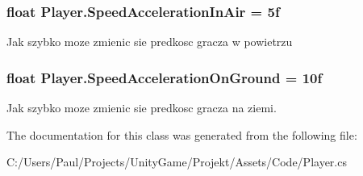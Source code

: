 \subsubsection[{Speed\+Acceleration\+In\+Air}]{\setlength{\rightskip}{0pt plus 5cm}float Player.\+Speed\+Acceleration\+In\+Air = 5f}\label{class_player_a6a71edc877a84d4f038fcc2b8e4f2843}


Jak szybko moze zmienic sie predkosc gracza w powietrzu 

\hypertarget{class_player_ae1d47d3f4f67909f7498d900c1feedfa}{}
\subsubsection[{Speed\+Acceleration\+On\+Ground}]{\setlength{\rightskip}{0pt plus 5cm}float Player.\+Speed\+Acceleration\+On\+Ground = 10f}\label{class_player_ae1d47d3f4f67909f7498d900c1feedfa}


Jak szybko moze zmienic sie predkosc gracza na ziemi. 



The documentation for this class was generated from the following file\+:\begin{DoxyCompactItemize}
\item 
C\+:/\+Users/\+Paul/\+Projects/\+Unity\+Game/\+Projekt/\+Assets/\+Code/Player.\+cs\end{DoxyCompactItemize}
